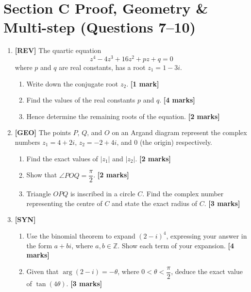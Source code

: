 \documentclass[11pt,a4paper]{article}
\begin{document}
\section*{Section C \quad Proof, Geometry \& Multi-step \hfill{\normalfont\small(Questions 7--10)}}
\begin{enumerate}[resume]

\item \textbf{[REV]} The quartic equation
\[
z^4 - 4z^3 + 16z^2 + pz + q = 0
\]
where $p$ and $q$ are real constants, has a root $z_1 = 1 - 3i$.
\begin{enumerate}[label=(\alph*)]
  \item Write down the conjugate root $z_2$. \hfill{\textbf{[1 mark]}}
  \item Find the values of the real constants $p$ and $q$. \hfill{\textbf{[4 marks]}}
  \item Hence determine the remaining roots of the equation. \hfill{\textbf{[2 marks]}}
\end{enumerate}

\item \textbf{[GEO]} The points $P$, $Q$, and $O$ on an Argand diagram represent the complex numbers $z_1 = 4 + 2i$, $z_2 = -2 + 4i$, and $0$ (the origin) respectively.
\begin{enumerate}[label=(\alph*)]
  \item Find the exact values of $|z_1|$ and $|z_2|$. \hfill{\textbf{[2 marks]}}
  \item Show that $\angle POQ = \dfrac{\pi}{2}$. \hfill{\textbf{[2 marks]}}
  \item Triangle $OPQ$ is inscribed in a circle $C$. Find the complex number representing the centre of $C$ and state the exact radius of $C$. \hfill{\textbf{[3 marks]}}
\end{enumerate}

\item \textbf{[SYN]} 
\begin{enumerate}[label=(\alph*)]
  \item Use the binomial theorem to expand $(2 - i)^4$, expressing your answer in the form $a + bi$, where $a, b \in \mathbb{Z}$. Show each term of your expansion. \hfill{\textbf{[4 marks]}}
  \item Given that $\arg(2 - i) = -\theta$, where $0 < \theta < \dfrac{\pi}{2}$, deduce the exact value of $\tan(4\theta)$. \hfill{\textbf{[3 marks]}}
\end{enumerate}


\end{enumerate}
\end{document}
